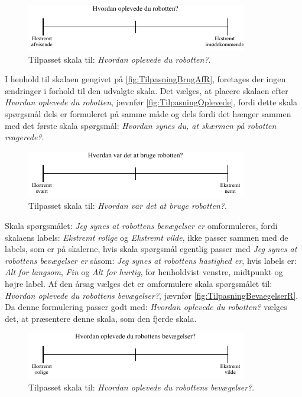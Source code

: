 %
\begin{figure}[H]
\centering
\includegraphics[width =\textwidth]{Figure/TilpasningAfSkalaer/TilpassetOplevede} 
\caption{Tilpasset skala til: \textit{Hvordan oplevede du robotten?}.}
\label{fig:TilpasningOplevede}
\end{figure}
\noindent
%
I henhold til skalaen gengivet på \autoref{fig:TilpasningBrugAfR}, foretages der ingen ændringer i forhold til den udvalgte skala. Det vælges, at placere skalaen efter \textit{Hvordan oplevede du robotten}, jævnfør \autoref{fig:TilpasningOplevede}, fordi dette skala spørgsmål dels er formuleret på samme måde og dels fordi det hænger sammen med det første skala spørgsmål: \textit{Hvordan synes du, at skærmen på robotten reagerede?}.
%
\begin{figure}[H]
\centering
\includegraphics[width =\textwidth]{Figure/TilpasningAfSkalaer/TilpassetHvordanVarDetAtBrugeR} 
\caption{Tilpasset skala til: \textit{Hvordan var det at bruge robotten?}.}
\label{fig:TilpasningBrugAfR}
\end{figure}
\noindent
%
Skala spørgsmålet: \textit{Jeg synes at robottens bevægelser er} omformuleres, fordi skalaens labels: \textit{Ekstremt rolige} og \textit{Ekstremt vilde}, ikke passer sammen med de labels, som er på skalerne, hvis skala spørgsmål egentlig passer med \textit{Jeg synes at robottens bevægelser er} såsom: \textit{Jeg synes at robottens hastighed er}, hvis labels er: \textit{Alt for langsom}, \textit{Fin} og \textit{Alt for hurtig}, for henholdvist venstre, midtpunkt og højre label. Af den årsag vælges det er omformulere skala spørgsmålet til: \textit{Hvordan oplevede du robottens bevægelser?}, jævnfør \autoref{fig:TilpasningBevaegelserR}. Da denne formulering passer godt med: \textit{Hvordan oplevede du robotten?} vælges det, at præsentere denne skala, som den fjerde skala. 
%
\begin{figure}[H]
\centering
\includegraphics[width =\textwidth]{Figure/TilpasningAfSkalaer/TilpassetBevaegelserR} 
\caption{Tilpasset skala til: \textit{Hvordan oplevede du robottens bevægelser?}.}
\label{fig:TilpasningBevaegelserR}
\end{figure}
